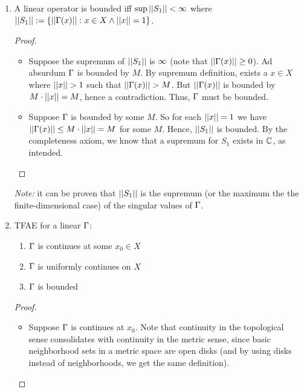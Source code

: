 \documentclass[a4paper]{article}
\begin{document}
	\begin{enumerate}
		\item A linear operator is bounded iff $\sup \left \vert \left \vert S_1 \right \vert \right \vert < \infty$ where $\left \vert \left \vert S_1 \right \vert \right \vert := \{\left \vert \left \vert \Gamma(x) \right \vert \right \vert \colon x \in X \land \left \vert \left \vert x \right \vert \right \vert = 1\}$. \begin{proof}
			\begin{itemize}
				\item[$\impliedby$] Suppose the supremum of $\left \vert \left \vert S_1 \right \vert \right \vert$ is $\infty$ (note that $\left \vert \left \vert \Gamma(x) \right \vert \right \vert \ge 0$). Ad absurdum $\Gamma$ is bounded by $M$. By supremum definition, exists a $x \in X$ where $\left \vert \left \vert x \right \vert \right \vert > 1$ such that $\left \vert \left \vert \Gamma(x) \right \vert \right \vert > M$. But $\left \vert \left \vert \Gamma(x) \right \vert \right \vert$ is bounded by $M \cdot \left \vert \left \vert x \right \vert \right \vert = M$, hence a contradiction. Thus, $\Gamma$ must be bounded. 
				\item[$\implies$] Suppose $\Gamma$ is bounded by some $M$. So for each $\left \vert \left \vert x \right \vert \right \vert = 1$ we have $\left \vert \left \vert \Gamma(x) \right \vert \right \vert \le M \cdot \left \vert \left \vert x \right \vert \right \vert = M$ for some $M$. Hence, $\left \vert \left \vert S_1 \right \vert \right \vert$ is bounded. By the completeness axiom, we know that a supremum for $S_1$ exists in $\mathbb{C}$, as intended. 
			\end{itemize}
		\end{proof}
		\textit{Note: }it can be proven that $\left \vert \left \vert S_1 \right \vert \right \vert$ is the supremum (or the maximum the the finite-dimensional case) of the singular values of $\Gamma$. 
		\item TFAE for a linear $\Gamma$: 
		\begin{enumerate}
			\item[a)]$\Gamma$ is continues at some $x_0 \in X$
			\item[b)]$\Gamma$ is uniformly continues on $X$
			\item[c)]$\Gamma$ is bounded
		\end{enumerate}
		\begin{proof}
			\begin{itemize}
				\item[a$\to$b]Suppose $\Gamma$ is continues at $x_0$. Note that continuity in the topological sense consolidates with continuity in the metric sense, since basic neighborhood sets in a metric space are open disks (and by using disks instead of neighborhoods, we get the same definition). 
				

\end{itemize}
\end{proof}
\end{enumerate}
\end{document}
